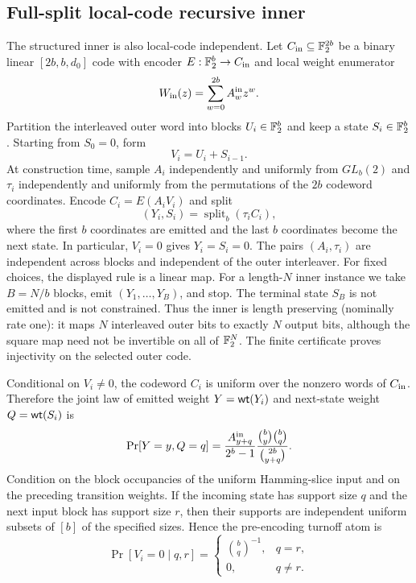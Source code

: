 \subsection{Full-split local-code recursive inner}
\label{sec:fullsplit-local-code-inner}

The structured inner is also local-code independent.  Let
\(C_{\rm in}\subseteq\mathbb{F}_2^{2b}\) be a binary linear \([2b,b,d_0]\) code with
encoder \(E:\mathbb{F}_2^b\to C_{\rm in}\) and local weight enumerator
\[
W_{\rm in}(z)=\sum_{w=0}^{2b} A_w^{\rm in}z^w .
\]
Partition the interleaved outer word into blocks \(U_i\in\mathbb{F}_2^b\) and keep a
state \(S_i\in\mathbb{F}_2^b\).  Starting from \(S_0=0\), form
\[
V_i=U_i+S_{i-1}.
\]
At construction time, sample \(A_i\) independently and uniformly from
\(GL_b(2)\) and \(\tau_i\) independently and uniformly from the permutations
of the \(2b\) codeword coordinates.  Encode \(C_i=E(A_iV_i)\) and split
\[
(Y_i,S_i)=\operatorname{split}_b(\tau_i C_i),
\]
where the first \(b\) coordinates are emitted and the last \(b\) coordinates
become the next state.  In particular, \(V_i=0\) gives \(Y_i=S_i=0\).
The pairs \((A_i,\tau_i)\) are independent across blocks and independent of the
outer interleaver.  For fixed choices, the displayed rule is a linear map.
For a length-\(N\) inner instance we take \(B=N/b\) blocks, emit
\((Y_1,\dots,Y_B)\), and stop.  The terminal state \(S_B\) is not emitted and
is not constrained.  Thus the inner is length preserving (nominally rate one):
it maps \(N\) interleaved outer bits to exactly \(N\) output bits, although the
square map need not be invertible on all of \(\mathbb{F}_2^N\).  The finite certificate
proves injectivity on the selected outer code.

\begin{lemma}
\label{lem:fullsplit-one-step-law}
Conditional on \(V_i\ne0\), the codeword \(C_i\) is uniform over the nonzero
words of \(C_{\rm in}\).  Therefore the joint law of emitted weight
\(Y=\mathsf{wt}(Y_i)\) and next-state weight \(Q=\mathsf{wt}(S_i)\) is
\[
\Pr[Y=y,Q=q]
=
\frac{A^{\rm in}_{y+q}}{2^b-1}
\frac{\binom{b}{y}\binom{b}{q}}{\binom{2b}{y+q}}.
\]
Condition on the block occupancies of the uniform Hamming-slice input and on
the preceding transition weights.  If the incoming state has support size
\(q\) and the next input block has support size \(r\), then their supports are
independent uniform subsets of \([b]\) of the specified sizes.  Hence the
pre-encoding turnoff atom is
\[
\Pr[V_i=0\mid q,r]
=
\begin{cases}
\binom{b}{q}^{-1}, & q=r,\\
0, & q\ne r.
\end{cases}
\]
\end{lemma}

